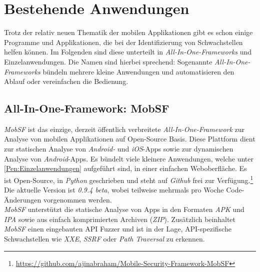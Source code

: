 \section{Bestehende Anwendungen}
Trotz der relativ neuen Thematik der mobilen Applikationen gibt es schon einige Programme und Applikationen, die bei der Identifizierung von Schwachstellen helfen können. Im Folgenden sind diese unterteilt in \textit{All-In-One-Frameworks} und Einzelanwendungen. Die Namen sind hierbei sprechend: Sogenannte \textit{All-In-One-Frameworks} bündeln mehrere kleine Anwendungen und automatisieren den Ablauf oder vereinfachen die Bedienung.

\subsection{All-In-One-Framework: MobSF}
\textit{MobSF} ist das einzige, derzeit öffentlich verbreitete \textit{All-In-One-Framework} zur Analyse von mobilen Applikationen auf Open-Source Basis. Diese Plattform dient zur statischen Analyse von \textit{Android-} und \textit{iOS}-Apps sowie zur dynamischen Analyse von \textit{Android}-Apps. Es bündelt viele kleinere Anwendungen, welche unter \ref{Pen:Einzelanwendungen} aufgeführt sind, in einer einfachen Weboberfläche. Es ist Open-Source, in \textit{Python} geschrieben und steht auf \textit{Github} frei zur Verfügung.\footnote{\url{https://github.com/ajinabraham/Mobile-Security-Framework-MobSF}} Die aktuelle Version ist \textit{0.9.4 beta}, wobei teilweise mehrmals pro Woche Code-Änderungen vorgenommen werden.\\

\textit{MobSF} unterstützt die statische Analyse von Apps in den Formaten \textit{APK} und \textit{IPA} sowie aus einfach komprimierten Archiven (\textit{ZIP}). Zusätzlich beinhaltet \textit{MobSF} einen eingebauten API Fuzzer und ist in der Lage, API-spezifische Schwachstellen wie \textit{XXE}, \textit{SSRF} oder \textit{Path Traversal} zu erkennen.


